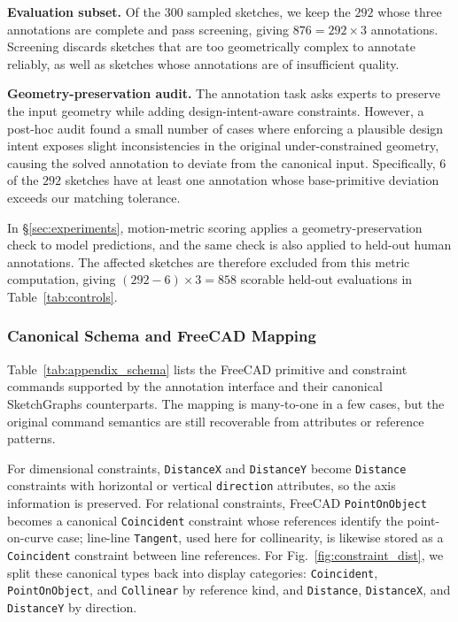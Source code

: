 \textbf{Evaluation subset.} Of the $300$ sampled sketches, we keep the $292$ whose three annotations are complete and pass screening, giving $876=292\times3$ annotations. Screening discards sketches that are too geometrically complex to annotate reliably, as well as sketches whose annotations are of insufficient quality.

\textbf{Geometry-preservation audit.} The annotation task asks experts to preserve the input geometry while adding design-intent-aware constraints. However, a post-hoc audit found a small number of cases where enforcing a plausible design intent exposes slight inconsistencies in the original under-constrained geometry, causing the solved annotation to deviate from the canonical input. Specifically, $6$ of the $292$ sketches have at least one annotation whose base-primitive deviation exceeds our matching tolerance.

In \S\ref{sec:experiments}, motion-metric scoring applies a geometry-preservation check to model predictions, and the same check is also applied to held-out human annotations. The affected sketches are therefore excluded from this metric computation, giving $(292-6)\times3=858$ scorable held-out evaluations in Table~\ref{tab:controls}.

\subsubsection{Canonical Schema and FreeCAD Mapping}
\label{sec:appendix_dataset_schema}

Table~\ref{tab:appendix_schema} lists the FreeCAD primitive and constraint commands supported by the annotation interface and their canonical SketchGraphs counterparts. The mapping is many-to-one in a few cases, but the original command semantics are still recoverable from attributes or reference patterns.

For dimensional constraints, \texttt{DistanceX} and \texttt{DistanceY} become \texttt{Distance} constraints with horizontal or vertical \texttt{direction} attributes, so the axis information is preserved. For relational constraints, FreeCAD \texttt{PointOnObject} becomes a canonical \texttt{Coincident} constraint whose references identify the point-on-curve case; line-line \texttt{Tangent}, used here for collinearity, is likewise stored as a \texttt{Coincident} constraint between line references. For Fig.~\ref{fig:constraint_dist}, we split these canonical types back into display categories: \texttt{Coincident}, \texttt{PointOnObject}, and \texttt{Collinear} by reference kind, and \texttt{Distance}, \texttt{DistanceX}, and \texttt{DistanceY} by direction.

